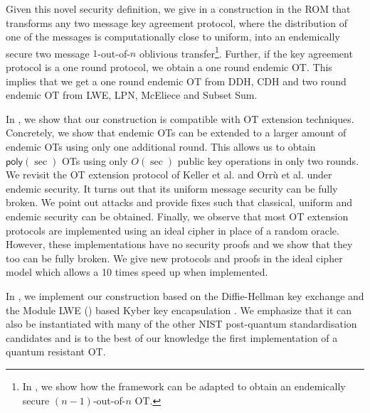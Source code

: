 Given this novel security definition, we give in  a construction in the ROM that transforms any two message key agreement protocol, where the distribution of one of the messages is computationally close to uniform, into an endemically secure two message $1$-out-of-$n$ oblivious transfer\footnote{In , we show how the framework can be adapted to obtain an endemically secure $(n-1)$-out-of-$n$ OT.}. Further, 
if the key agreement protocol is a one round protocol, we obtain a one round endemic OT. This implies that we get a one round endemic OT from DDH, CDH and two round endemic OT from LWE, LPN, McEliece and Subset Sum.

In , we show that our construction is compatible with OT extension techniques. Concretely, we show that endemic OTs can be extended to a larger amount of endemic OTs using only one additional round. This allows us to obtain $\mathsf{poly}(\sec)$ OTs using only $O(\sec)$ public key operations in only two rounds. We revisit the OT extension protocol of Keller et al. and Orr{\`u} et al. \cite{C:KelOrsSch15,RSA:OrrOrsSch17} under endemic security. It turns out that its uniform message security can be fully broken. We point out attacks and provide fixes such that classical, uniform and endemic security can be obtained. Finally, we observe that most OT extension protocols are implemented using an ideal cipher in place of a random oracle. However, these implementations have no security proofs and we show that they too can be fully broken. We give new protocols and proofs in the ideal cipher model which allows a 10 times speed up when implemented. 

In , we implement our construction based on the Diffie-Hellman key exchange and the Module LWE (\MLWE) based Kyber key encapsulation \cite{NISTPQC-R1:CRYSTALS-KYBER17}. We emphasize that it can also be instantiated with many of the other NIST post-quantum standardisation candidates and is to the best of our knowledge the first implementation of a quantum resistant OT.


